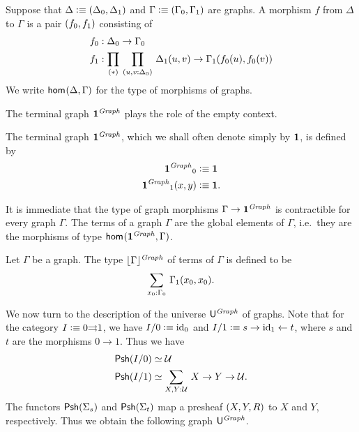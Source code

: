 \begin{defn}
Suppose that $\Delta\defeq \pairr{\Delta_0,\Delta_1}$ and $\Gamma\defeq \pairr{\Gamma_0,
\Gamma_1}$ are graphs. A morphism $f$ from $\Delta$ to $\Gamma$ is a pair
$\pairr{f_0,f_1}$ consisting of
\begin{align*}
f_0 & : \Delta_0\to\Gamma_0\\
f_1 & : \prd*{u,v:\Delta_0}\Delta_1(u,v)\to\Gamma_1(f_0(u),f_0(v))
\end{align*}
We write $\ctxhom{\Delta}{\Gamma}$ for the type of morphisms of graphs.
\end{defn}

The terminal graph $\unit^\mfGraph$ plays the role of the empty context.

\begin{defn}
The terminal graph $\unit^\mfGraph$, which we shall often denote simply 
by $\unit$, is defined by
\begin{align*}
{\unit^\mfGraph}_0 & \defeq \unit\\
{\unit^\mfGraph}_1(x,y) & \defeq \unit.
\end{align*}
\end{defn}

It is immediate that the type of graph morphisms $\Gamma\to\unit^\mfGraph$ is
contractible for every graph $\Gamma$. The terms of a graph $\Gamma$ are the
global elements of $\Gamma$, i.e.~they are the morphisms of type 
$\ctxhom{\unit^\mfGraph}{\Gamma}$.

\begin{defn}
Let $\Gamma$ be a graph. The type $\terms[\mfGraph]{\Gamma}$ of terms of $\Gamma$ is
defined to be
\begin{equation*}
\sm{x_0:\Gamma_0}\Gamma_1(x_0,x_0).
\end{equation*}
\end{defn}

We now turn to the description of the universe $\gobjclass$ of graphs. Note
that for the category $I\defeq 0{\rightrightarrows}1$, we have
$I/0\defeq\catid{0}$ and $I/1\defeq s\rightarrow\catid{1}\leftarrow t$, where
$s$ and $t$ are the morphisms $0\to 1$. Thus we have 
\begin{align*}
\psh(I/0) & \eqvsym \type\\
\psh(I/1) & \eqvsym \sm{X,Y:\type}X\to Y\to\type.
\end{align*}
The functors $\psh(\Sigma_s)$ and $\psh(\Sigma_t)$ map a presheaf 
$\pairr{X,Y,R}$ to $X$ and $Y$, respectively. 
Thus we obtain the following graph $\gobjclass$.

